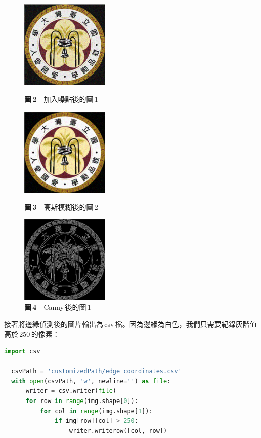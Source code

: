  \begin{figure}[t!]
  \centering
    \begin{minipage}{0.3\linewidth}
      \centering
      \includegraphics[width=120pt]{NTU noise.jpg}
      \caption*{\textbf{圖\,2}\(\quad\)加入噪點後的圖\,1}
    \end{minipage}
    \quad
    \begin{minipage}{0.3\linewidth}
      \centering
      \includegraphics[width=120pt]{NTU blur.jpg}
      \caption*{\textbf{圖\,3}\(\quad\)高斯模糊後的圖\,2}
    \end{minipage}
    \quad
    \begin{minipage}{0.3\linewidth}
      \centering
      \includegraphics[width=120pt]{NTU edge.jpg}
      \caption*{\textbf{圖\,4}\(\quad\)Canny\,後的圖\,1}
    \end{minipage}
  \end{figure}
  \noindent 接著將邊緣偵測後的圖片輸出為\,csv\,檔。因為邊緣為白色，我們只需要紀錄灰階值高於\,\(250\)\,的像素：
  \begin{lstlisting}[language=Python]
  import csv

  csvPath = 'customizedPath/edge coordinates.csv'
  with open(csvPath, 'w', newline='') as file:
      writer = csv.writer(file)
      for row in range(img.shape[0]):
          for col in range(img.shape[1]):
              if img[row][col] > 250:
                  writer.writerow([col, row])
  \end{lstlisting}
